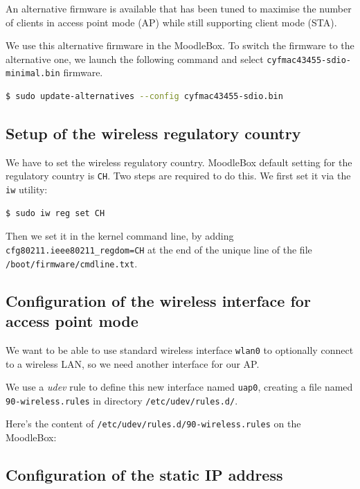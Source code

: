 \documentclass[12pt]{article}
\begin{document}
An alternative firmware is available that has been tuned to maximise the number of clients in access point mode (AP) while still supporting client mode (STA).

We use this alternative firmware in the MoodleBox.
To switch the firmware to the alternative one, we launch the following command and select \lstinline{cyfmac43455-sdio-minimal.bin} firmware.

\begin{lstlisting}[language=bash]
$ sudo update-alternatives --config cyfmac43455-sdio.bin
\end{lstlisting}

\subsection{Setup of the wireless regulatory country}

We have to set the wireless regulatory country.
MoodleBox default setting for the regulatory country is \lstinline{CH}.
Two steps are required to do this.
We first set it via the \lstinline{iw} utility:
\begin{lstlisting}[language=bash]
$ sudo iw reg set CH
\end{lstlisting}
Then we set it in the kernel command line, by adding \lstinline{cfg80211.ieee80211_regdom=CH} at the end of the unique line of the file \lstinline{/boot/firmware/cmdline.txt}.

\subsection{Configuration of the wireless interface for access point mode}

We want to be able to use standard wireless interface \lstinline{wlan0} to optionally connect to a wireless LAN, so we need another interface for our AP.

We use a \textsl{udev} rule to define this new interface named \lstinline{uap0}, creating a file named \lstinline{90-wireless.rules} in directory \lstinline{/etc/udev/rules.d/}.

Here's the content of \lstinline{/etc/udev/rules.d/90-wireless.rules} on the MoodleBox:


\subsection{Configuration of the static IP address}\label{ssec-static-ip}
\end{document}
